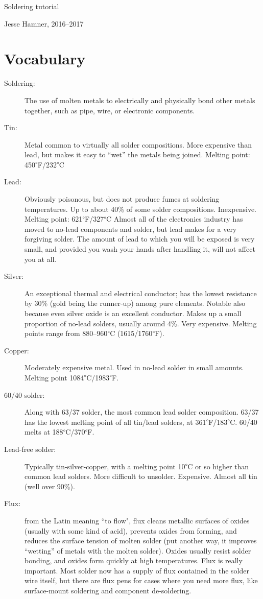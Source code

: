 \documentclass[12pt]{article}
\newcommand{\degs}[1]{\textsuperscript{$\circ$}#1}
\newcommand{\+}{\item}
\begin{document}
\begin{center}
{\LARGE Soldering tutorial}

\bigskip
Jesse Hamner, 2016--2017
\end{center}

\section{Vocabulary}

\begin{description}

\+[Soldering:] The use of molten metals to electrically and physically bond other metals together, such as pipe, wire, or electronic components.

\+[Tin:] Metal common to virtually all solder compositions. More expensive than lead, but makes it easy to ``wet'' the metals being joined. Melting point: 450\degs{F}/232\degs{C}

\+[Lead:] Obviously poisonous, but does not produce fumes at soldering temperatures. Up to about 40\% of some solder compositions. Inexpensive. Melting point: 621\degs{F}/327\degs{C} Almost all of the electronics industry has moved to no-lead components and solder, but lead makes for a very forgiving solder. The amount of lead to which you will be exposed is very small, and provided you wash your hands after handling it, will not affect you at all.

\+[Silver:] An exceptional thermal and electrical conductor; has the lowest resistance by 30\% (gold being the runner-up)  among pure elements. Notable also because even silver oxide is an excellent conductor. Makes up a small proportion of no-lead solders, usually around 4\%. Very expensive. Melting points range from 880--960\degs{C} (1615/1760\degs{F}). 

\+[Copper:] Moderately expensive metal. Used in no-lead solder in small amounts. Melting point 1084\degs{C}/1983\degs{F}. 

\+[60/40 solder:] Along with 63/37 solder, the most common lead solder composition. 63/37 has the lowest melting point of all tin/lead solders, at 361\degs{F}/183\degs{C}. 60/40 melts at 188\degs{C}/370\degs{F}. 

\+[Lead-free solder:] Typically tin-silver-copper, with a melting point 10\degs{C} or so higher than common lead solders. More difficult to unsolder. Expensive. Almost all tin (well over 90\%).

\+[Flux:] from the Latin meaning ``to flow", flux cleans metallic surfaces of oxides (usually with some kind of acid), prevents oxides from forming, and reduces the surface tension of molten solder (put another way, it improves ``wetting'' of metals with the molten solder). Oxides usually resist solder bonding, and oxides form quickly at high temperatures. Flux is really important. Most solder now has a supply of flux contained in the solder wire itself, but there are flux pens for cases where you need more flux, like surface-mount soldering and component de-soldering.


\end{description}
\end{document}
